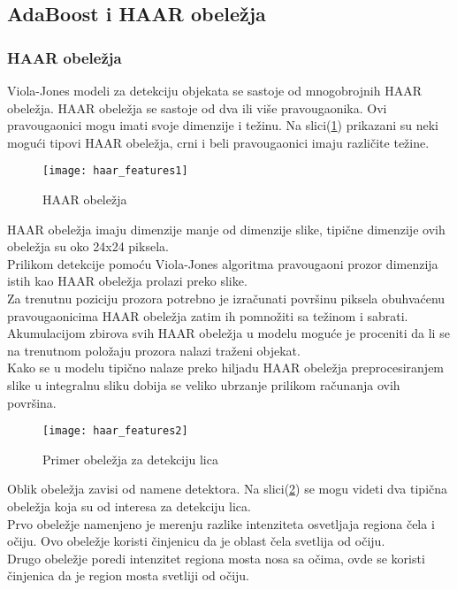 \subsection{AdaBoost i HAAR obeležja}

\subsubsection{HAAR obeležja} \label{haar_features_sec}

Viola-Jones modeli za detekciju objekata se sastoje od mnogobrojnih HAAR obeležja.
HAAR obeležja se sastoje od dva ili više pravougaonika.
Ovi pravougaonici mogu imati svoje dimenzije i težinu.
Na slici(\ref{haar_features_img1}) prikazani su neki mogući tipovi HAAR
obeležja, crni i beli pravougaonici imaju različite težine.

\begin{figure}[H]
  \centering
  \texttt{[image: haar\_features1]}
  \caption{HAAR obeležja \cite{Jensen2008ImplementingTV}}
  \label{haar_features_img1}
\end{figure}

HAAR obeležja imaju dimenzije manje od dimenzije slike, tipične dimenzije ovih
obeležja su oko 24x24 piksela. \\
Prilikom detekcije pomoću Viola-Jones algoritma pravougaoni prozor dimenzija
istih kao HAAR obeležja prolazi preko slike. \\
Za trenutnu poziciju prozora potrebno je izračunati površinu piksela obuhvaćenu
pravougaonicima HAAR obeležja zatim ih pomnožiti sa težinom i sabrati. \\
Akumulacijom zbirova svih HAAR obeležja u modelu moguće je proceniti da li se na trenutnom položaju
prozora nalazi traženi objekat. \\

Kako se u modelu tipično nalaze preko hiljadu HAAR obeležja preprocesiranjem
slike u integralnu sliku dobija se veliko ubrzanje prilikom računanja ovih
površina. \\

\begin{figure}[H]
  \centering
  \texttt{[image: haar\_features2]}
  \caption{Primer obeležja za detekciju lica \cite{Viola2001RapidOD}}
  \label{haar_features_img2}
\end{figure}

Oblik obeležja zavisi od namene detektora.
Na slici(\ref{haar_features_img2}) se mogu videti dva tipična obeležja koja su od
interesa za detekciju lica. \\
Prvo obeležje namenjeno je merenju razlike intenziteta osvetljaja regiona čela i očiju.
Ovo obeležje koristi činjenicu da je oblast čela svetlija od očiju. \\
Drugo obeležje poredi intenzitet regiona mosta nosa sa očima, ovde se koristi
činjenica da je region mosta svetliji od očiju. \\

